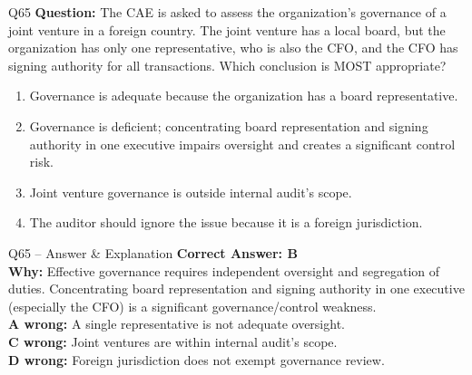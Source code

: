 \documentclass[aspectratio=169,10pt]{beamer}
\begin{document}
	\begin{frame}[t]{Q65}
		\small
		\textbf{Question:} The CAE is asked to assess the organization's governance of a joint venture in a foreign country. The joint venture has a local board, but the organization has only one representative, who is also the CFO, and the CFO has signing authority for all transactions. Which conclusion is MOST appropriate?
		\begin{enumerate}[label=\Alph*.,itemsep=1pt,topsep=2pt]
			\item Governance is adequate because the organization has a board representative.
			\item Governance is deficient; concentrating board representation and signing authority in one executive impairs oversight and creates a significant control risk.
			\item Joint venture governance is outside internal audit's scope.
			\item The auditor should ignore the issue because it is a foreign jurisdiction.
		\end{enumerate}
	\end{frame}
	
	\begin{frame}[t]{Q65 -- Answer \& Explanation}
		\small
		\textbf{Correct Answer: B} \\[4pt]
		\textbf{Why:} Effective governance requires independent oversight and segregation of duties. Concentrating board representation and signing authority in one executive (especially the CFO) is a significant governance/control weakness. \\[4pt]
		\textbf{A wrong:} A single representative is not adequate oversight. \\[2pt]
		\textbf{C wrong:} Joint ventures are within internal audit's scope. \\[2pt]
		\textbf{D wrong:} Foreign jurisdiction does not exempt governance review.
	\end{frame}
	
\end{document}
